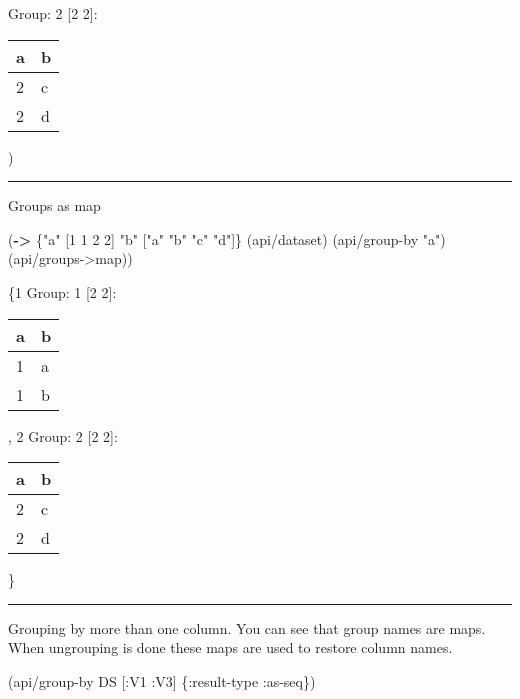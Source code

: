 \documentclass[]{article}
\newenvironment{Shaded}{\begin{snugshade}}{\end{snugshade}}
\newcommand{\AttributeTok}[1]{\textcolor[rgb]{0.77,0.63,0.00}{#1}}
\newcommand{\DecValTok}[1]{\textcolor[rgb]{0.00,0.00,0.81}{#1}}
\newcommand{\KeywordTok}[1]{\textcolor[rgb]{0.13,0.29,0.53}{\textbf{#1}}}
\newcommand{\NormalTok}[1]{#1}
\newcommand{\StringTok}[1]{\textcolor[rgb]{0.31,0.60,0.02}{#1}}
\begin{document}
Group: 2 {[}2 2{]}:

\begin{longtable}[]{@{}ll@{}}
\toprule
a & b\tabularnewline
\midrule
\endhead
2 & c\tabularnewline
2 & d\tabularnewline
\bottomrule
\end{longtable}

)

\begin{center}\rule{0.5\linewidth}{0.5pt}\end{center}

Groups as map

\begin{Shaded}
\begin{Highlighting}[]
\NormalTok{(}\KeywordTok{->}\NormalTok{ \{}\StringTok{"a"}\NormalTok{ [}\DecValTok{1} \DecValTok{1} \DecValTok{2} \DecValTok{2}\NormalTok{]}
     \StringTok{"b"}\NormalTok{ [}\StringTok{"a"} \StringTok{"b"} \StringTok{"c"} \StringTok{"d"}\NormalTok{]\}}
\NormalTok{    (api/dataset)}
\NormalTok{    (api/group-by }\StringTok{"a"}\NormalTok{)}
\NormalTok{    (api/groups->map))}
\end{Highlighting}
\end{Shaded}

\{1 Group: 1 {[}2 2{]}:

\begin{longtable}[]{@{}ll@{}}
\toprule
a & b\tabularnewline
\midrule
\endhead
1 & a\tabularnewline
1 & b\tabularnewline
\bottomrule
\end{longtable}

, 2 Group: 2 {[}2 2{]}:

\begin{longtable}[]{@{}ll@{}}
\toprule
a & b\tabularnewline
\midrule
\endhead
2 & c\tabularnewline
2 & d\tabularnewline
\bottomrule
\end{longtable}

\}

\begin{center}\rule{0.5\linewidth}{0.5pt}\end{center}

Grouping by more than one column. You can see that group names are maps.
When ungrouping is done these maps are used to restore column names.

\begin{Shaded}
\begin{Highlighting}[]
\NormalTok{(api/group-by DS [}\AttributeTok{:V1} \AttributeTok{:V3}\NormalTok{] \{}\AttributeTok{:result-type} \AttributeTok{:as-seq}\NormalTok{\})}
\end{Highlighting}
\end{Shaded}
\end{document}
